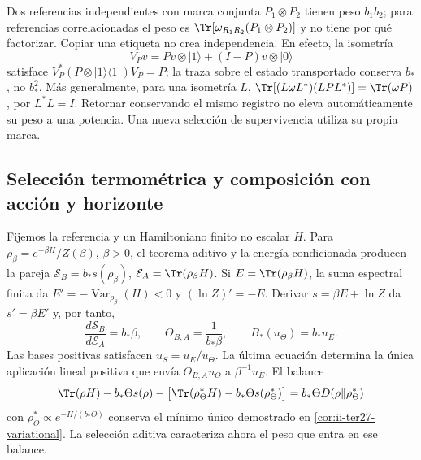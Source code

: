 Dos referencias independientes con marca conjunta $P_1\otimes P_2$
tienen peso $b_1b_2$; para referencias correlacionadas el peso es
$\Tr[\omega_{R_1R_2}(P_1\otimes P_2)]$ y no tiene por qué factorizar.
Copiar una etiqueta no crea independencia. En efecto, la isometría
\[
 V_Pv=Pv\otimes|1\rangle+(I-P)v\otimes|0\rangle
\]
satisface $V_P^*(P\otimes|1\rangle\langle1|)V_P=P$; la traza sobre
el estado transportado conserva $b_*$, no $b_*^2$. Más generalmente,
para una isometría $L$,
$\Tr[(L\omega L^*)(LPL^*)]=\Tr(\omega P)$, por $L^*L=I$.
Retornar conservando el mismo registro no eleva automáticamente su peso
a una potencia. Una nueva selección de supervivencia utiliza su propia marca.

\subsection{Selección termométrica y composición con acción y horizonte}
\label{subsec:ii-tins-seleccion}

Fijemos la referencia y un Hamiltoniano finito no escalar $H$. Para
$\rho_\beta=e^{-\beta H}/Z(\beta)$, $\beta>0$, el teorema aditivo y
la energía condicionada producen la pareja
$\mathcal S_B=b_*s(\rho_\beta)$, $\mathcal E_A=\Tr(\rho_\beta H)$.
Si $E=\Tr(\rho_\beta H)$, la suma espectral finita da
$E'=-\operatorname{Var}_{\rho_\beta}(H)<0$ y
$(\ln Z)'=-E$. Derivar $s=\beta E+\ln Z$ da $s'=\beta E'$ y, por tanto,
\begin{equation}
 \frac{d\mathcal S_B}{d\mathcal E_A}=b_*\beta,\qquad
 \Theta_{B,A}=\frac1{b_*\beta},\qquad B_*(u_\Theta)=b_*u_E.
 \label{eq:ii-tins-temperature}
\end{equation}
Las bases positivas satisfacen $u_S=u_E/u_\Theta$. La última ecuación
determina la única aplicación lineal positiva que envía
$\Theta_{B,A}u_\Theta$ a $\beta^{-1}u_E$. El balance
\[
 \Tr(\rho H)-b_*\Theta s(\rho)-
 \bigl[\Tr(\rho_\Theta^*H)-b_*\Theta s(\rho_\Theta^*)\bigr]
 =b_*\Theta D(\rho\Vert\rho_\Theta^*)
\]
con $\rho_\Theta^*\propto e^{-H/(b_*\Theta)}$ conserva el mínimo
único demostrado en \ref{cor:ii-ter27-variational}. La selección aditiva
caracteriza ahora el peso que entra en ese balance.

